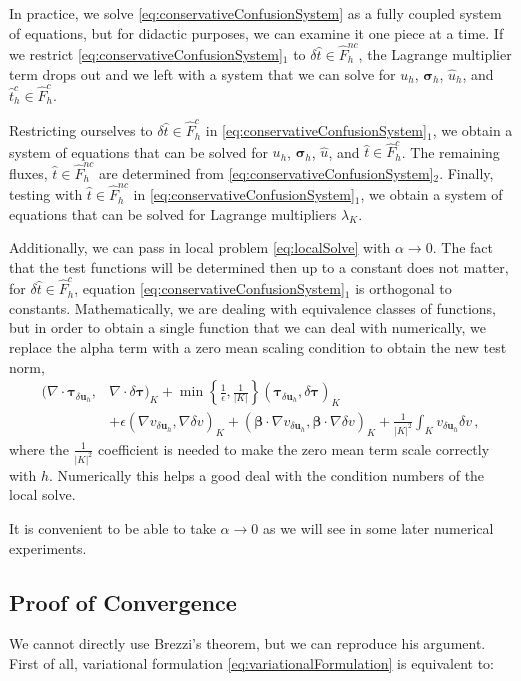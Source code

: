 \documentclass[letterpaper]{article}
\def\btau{\boldsymbol\tau}
\def\bsigma{\boldsymbol\sigma}
\def\bbeta{\boldsymbol\beta}
\newcommand{\bs}[1]{\boldsymbol{#1}}
\newcommand{\vdeltau}{v_{\delta\bs u_h}}
\newcommand{\taudeltau}{\btau_{\delta\bs u_h}}
\begin{document}
In practice, we solve \eqref{eq:conservativeConfusionSystem} as a fully 
coupled system of equations, but for didactic purposes, we can examine it 
one piece at a time. If we restrict \eqref{eq:conservativeConfusionSystem}$_1$
to $\delta\hat t\in\hat F_h^{nc}$, the Lagrange multiplier term drops out and we 
left with a system that we can solve for $u_h$, $\bsigma_h$, $\hat u_h$, and 
$\hat t_h^c\in\hat F^c_h$.

Restricting ourselves to $\delta\hat t\in\hat
F_h^{c}$ in \eqref{eq:conservativeConfusionSystem}$_1$, we obtain a system  of
equations that can be solved for $u_h$, $\bsigma_h$, $\hat u$, and $\hat
t\in\hat F_h^c$. The remaining fluxes, $\hat t\in\hat F_h^{nc}$ are determined
from \eqref{eq:conservativeConfusionSystem}$_2$. Finally, testing with $\hat
t\in\hat F_h^{nc}$ in \eqref{eq:conservativeConfusionSystem}$_1$, we obtain a
system of equations that can be solved for Lagrange multipliers $\lambda_K$.

Additionally, we can pass in local problem \eqref{eq:localSolve} with
$\alpha\rightarrow0$. The fact that the test functions will be determined then
up to a constant does not matter, for $\delta\hat t\in\hat F_h^c$, equation
\eqref{eq:conservativeConfusionSystem}$_1$ is orthogonal to constants. 
Mathematically, we are dealing with equivalence classes of functions, but in order 
to obtain a single function that we can deal with numerically, we replace the alpha 
term with a zero mean scaling condition to obtain the new test norm,
\begin{align}
(\nabla\cdot\taudeltau,&\nabla\cdot\delta\btau)_K
+\min\left\{\frac{1}{\epsilon},\frac{1}{|K|}\right\}(\taudeltau,\delta\btau)_K
\nonumber\\
&+\epsilon(\nabla\vdeltau,\nabla \delta v)_K
+(\bbeta\cdot\nabla\vdeltau,\bbeta\cdot\nabla \delta v)_K
+\frac{1}{|K|^2}\int_K\vdeltau\delta v\,,
\label{eq:localSolveMod}
\end{align}
where the $\frac{1}{|K|^2}$ coefficient is needed to make the zero mean term 
scale correctly with $h$. Numerically this helps a good deal with the condition
numbers of the local solve.

It is convenient to be able to take $\alpha\rightarrow0$ as we will see in
some later numerical experiments.

\subsection{Proof of Convergence}
We cannot directly use Brezzi's theorem, but we can reproduce his argument.
First of all, variational formulation \eqref{eq:variationalFormulation} is
equivalent to:
\end{document}
